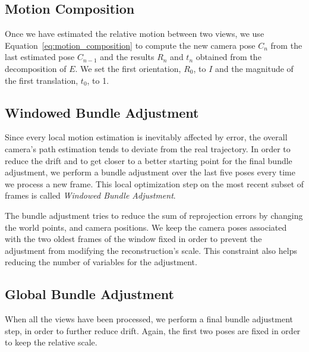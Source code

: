 \subsection{Motion Composition}
Once we have estimated the relative motion between two views, we use 
Equation~\ref{eq:motion_composition} to compute the new camera pose $C_n$ from 
the last estimated pose $C_{n-1}$ and the results $R_{n}$ and $t_n$ obtained 
from the decomposition of $E$.
We set the first orientation, $R_0$, to $I$ and the magnitude of the first 
translation, $t_0$, to 1.

\subsection{Windowed Bundle Adjustment}\label{subsec:windowed_ba}
Since every local motion estimation is inevitably affected by error, the overall 
camera's path estimation tends to deviate from the real trajectory.
In order to reduce the drift and to get closer to a better starting point 
for the final bundle adjustment, we perform a bundle adjustment over the last five poses every time we process a new frame.
This local optimization step on the most recent subset of frames is called
\textit{Windowed Bundle Adjustment}.

The bundle adjustment tries to reduce the sum of reprojection errors by changing the
world points, and camera positions. 
We keep the camera poses associated with the two oldest frames of the window 
fixed in order to prevent the adjustment from modifying the reconstruction's 
scale. This constraint also helps reducing the number of variables for the 
adjustment.

\subsection{Global Bundle Adjustment}
When all the views have been processed, we perform a final bundle adjustment 
step, in order to further reduce drift. Again, the first two poses are fixed in 
order to keep the relative scale.

